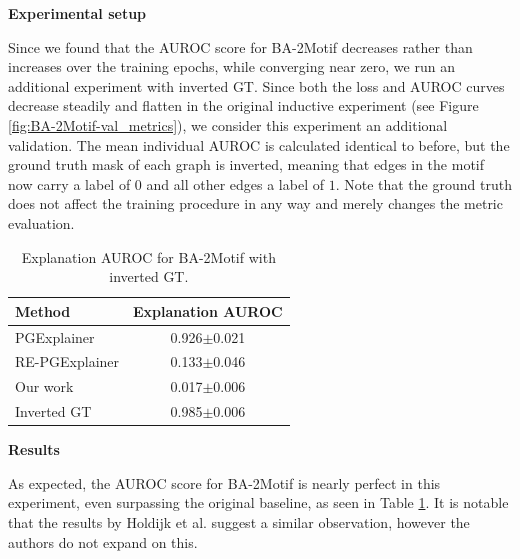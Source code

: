 \textbf{Experimental setup}\par
Since we found that the AUROC score for BA-2Motif decreases rather than increases over the training epochs, while converging near zero, we run an additional experiment with inverted  GT. Since both the loss and AUROC curves decrease steadily and flatten in the original inductive experiment (see Figure \ref{fig:BA-2Motif-val_metrics}), we consider this experiment an additional validation.
The mean individual AUROC is calculated identical to before, but the ground truth mask of each graph is inverted, meaning that edges in the motif now carry a label of $0$ and all other edges a label of $1$. 
Note that the ground truth does not affect the training procedure in any way and merely changes the metric evaluation. \bigskip

\begin{table}[ht]
    \centering
    \scriptsize
    \begin{tabularx}{0.45\textwidth}{l c}
        \toprule
        \textbf{Method} & \textbf{Explanation AUROC} \\
        \midrule
        PGExplainer       & 0.926$\pm$0.021 \\
        RE-PGExplainer       & 0.133$\pm$0.046 \\
        Our work       & 0.017$\pm$0.006 \\
        \midrule
        Inverted GT     & 0.985$\pm$0.006 \\
        \bottomrule
    \end{tabularx}
    \caption[Inductive performance on BA-2Motif with inverted ground truth]{Explanation AUROC for BA-2Motif with inverted GT.}
    \label{tab:flippedGT}
\end{table}
\newpage
\textbf{Results} \par

As expected, the AUROC score for BA-2Motif is nearly perfect in this experiment, even surpassing the original baseline, as seen in Table \ref{tab:flippedGT}. It is notable that the results by Holdijk et al. \cite{holdijk2021re} suggest a similar observation, however the authors do not expand on this.


